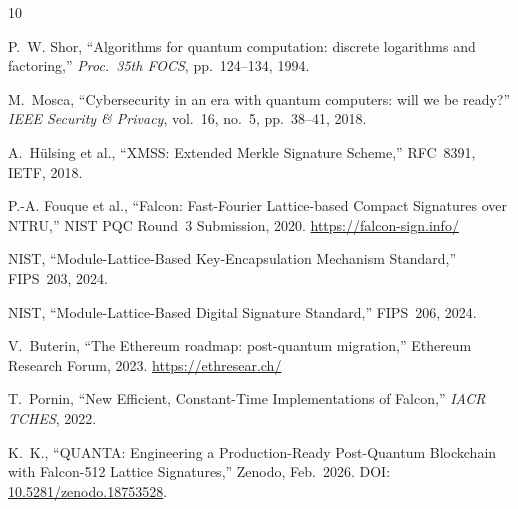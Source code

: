 \documentclass[11pt,a4paper]{article}
\begin{document}
\begin{thebibliography}{10}

P.~W. Shor,
``Algorithms for quantum computation: discrete logarithms and factoring,''
\textit{Proc.\ 35th FOCS}, pp.~124--134, 1994.

M.~Mosca,
``Cybersecurity in an era with quantum computers: will we be ready?''
\textit{IEEE Security \& Privacy}, vol.~16, no.~5, pp.~38--41, 2018.

A.~H\"ulsing et al.,
``XMSS: Extended Merkle Signature Scheme,'' RFC~8391, IETF, 2018.

P.-A. Fouque et al.,
``Falcon: Fast-Fourier Lattice-based Compact Signatures over NTRU,''
NIST PQC Round~3 Submission, 2020. \url{https://falcon-sign.info/}

NIST,
``Module-Lattice-Based Key-Encapsulation Mechanism Standard,''
FIPS~203, 2024.

NIST,
``Module-Lattice-Based Digital Signature Standard,''
FIPS~206, 2024.

V.~Buterin,
``The Ethereum roadmap: post-quantum migration,''
Ethereum Research Forum, 2023. \url{https://ethresear.ch/}

T.~Pornin,
``New Efficient, Constant-Time Implementations of Falcon,''
\textit{IACR TCHES}, 2022.

K.~K.,
``QUANTA: Engineering a Production-Ready Post-Quantum Blockchain
with Falcon-512 Lattice Signatures,''
Zenodo, Feb.\ 2026.
DOI: \href{https://doi.org/10.5281/zenodo.18753528}{10.5281/zenodo.18753528}.

\end{thebibliography}
\end{document}
